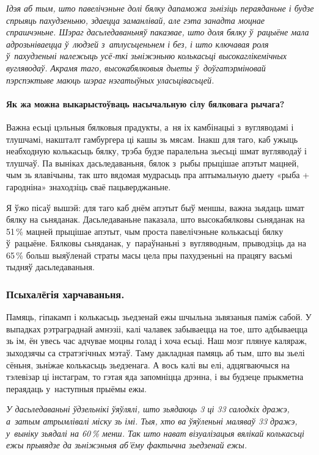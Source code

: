 \emph{Ідэя аб тым, што павелічэньне долі бялку дапаможа зьнізіць пераяданьне і будзе спрыяць пахудзеньню, здаецца заманлівай, але гэта занадта моцнае спрашчэньне. Шэраг дасьледаваньняў паказвае, што доля бялку ў~рацыёне мала адрозьніваецца ў~людзей з~атлусьценьнем і без, і што ключавая роля ў~пахудзеньні належыць усё-ткі зьніжэньню колькасьці высокаглікемічных вугляводаў. Акрамя таго, высокабялковыя дыеты ў~доўгатэрміновай пэрспэктыве маюць шэраг нэгатыўных уласьцівасьцей.}

\paragraph{Як жа можна выкарыстоўваць насычальную сілу бялковага рычага?} Важна есьці цэльныя бялковыя прадукты, а~ня іх камбінацыі з~вугляводамі і тлушчамі, накшталт гамбургера ці кашы зь мясам. Інакш для таго, каб ужыць неабходную колькасьць бялку, трэба будзе паралельна зьесьці шмат вугляводаў і тлушчаў. Па выніках дасьледаваньня, бялок з~рыбы прыцішае апэтыт мацней, чым зь ялавічыны, так што вядомая мудрасьць пра аптымальную дыету «рыба + гародніна» знаходзіць сваё пацьверджаньне.

Я ўжо пісаў вышэй: для таго каб днём апэтыт быў меншы, важна зьядаць шмат бялку на сьняданак. Дасьледаваньне паказала, што высокабялковы сьняданак на 51\,\% мацней прыцішае апэтыт, чым проста павелічэньне колькасьці бялку ў~рацыёне. Бялковы сьняданак, у~параўнаньні з~вугляводным, прыводзіць да на 65\,\% больш выяўленай страты масы цела пры пахудзеньні на працягу васьмі тыдняў дасьледаваньня.

\subsubsection{Псыхалёгія харчаваньня.}
Памяць, гіпакамп і колькасьць зьедзенай ежы шчыльна зьвязаныя паміж сабой. У выпадках рэтраграднай амнэзіі, калі чалавек забываецца на тое, што адбываецца зь ім, ён увесь час адчувае моцны голад і хоча есьці. Наш мозг плянуе каляраж, зыходзячы са стратэгічных мэтаў. Таму дакладная памяць аб тым, што вы зьелі сёньня, зьніжае колькасьць зьедзенага. А вось калі вы елі, адцягваючыся на тэлевізар ці інстаграм, то гэтая яда запомніцца дрэнна, і вы будзеце прыкметна пераядаць у~наступныя прыёмы ежы.

\emph{У дасьледаваньні ўдзельнікі ўяўлялі, што зьядаюць 3 ці 33 салодкіх дражэ, а~затым атрымлівалі міску зь імі. Тыя, хто ва ўяўленьні маляваў 33 дражэ, у~выніку зьядалі на 60\,\% менш. Так што нават візуалізацыя вялікай колькасьці ежы прывядзе да зьніжэньня аб'ёму фактычна зьедзенай ежы.}

